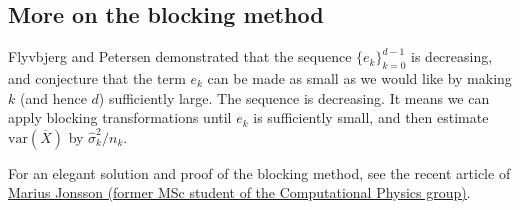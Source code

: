 \documentclass[%
oneside,                 %
final,                   %
10pt]{article}
\begin{document}
\subsection*{More on the blocking method}

Flyvbjerg and Petersen demonstrated that the sequence
$\{e_k\}_{k=0}^{d-1}$ is decreasing, and conjecture that the term
$e_k$ can be made as small as we would like by making $k$ (and hence
$d$) sufficiently large. The sequence is decreasing.
It means we can apply blocking transformations until
$e_k$ is sufficiently small, and then estimate $\mathrm{var}(\overline{X})$ by
$\widehat{\sigma}^2_k/n_k$. 

For an elegant solution and proof of the blocking method, see the recent article of \href{{https://journals.aps.org/pre/abstract/10.1103/PhysRevE.98.043304}}{Marius Jonsson (former MSc student of the Computational Physics group)}.

\end{document}
